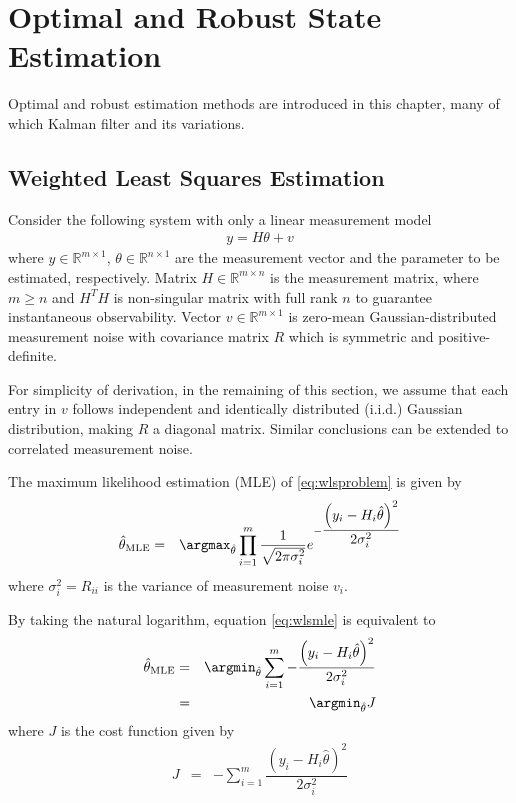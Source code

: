 \chapter{Optimal and Robust State Estimation} \label{ch:orse}

Optimal and robust estimation methods are introduced in this chapter, many of which Kalman filter and its variations.

\section{Weighted Least Squares Estimation}


Consider the following system with only a linear measurement model
\begin{eqnarray}
	y = H\theta + v \label{eq:wlsproblem}
\end{eqnarray}
where $y\in\mathbb{R}^{m\times 1}$, $\theta\in\mathbb{R}^{n\times 1}$ are the measurement vector and the parameter to be estimated, respectively. Matrix $H\in\mathbb{R}^{m\times n}$ is the measurement matrix, where $m\geq n$ and $H^TH$ is non-singular matrix with full rank $n$ to guarantee instantaneous observability. Vector $v\in\mathbb{R}^{m\times 1}$ is zero-mean Gaussian-distributed measurement noise with covariance matrix $R$ which is symmetric and positive-definite. 

For simplicity of derivation, in the remaining of this section, we assume that each entry in $v$ follows independent and identically distributed (i.i.d.) Gaussian distribution, making $R$ a diagonal matrix. Similar conclusions can be extended to correlated measurement noise.

The maximum likelihood estimation (MLE) of \eqref{eq:wlsproblem} is given by
\begin{eqnarray}
	\hat{\theta}_{\textup{MLE}} &=& \argmax_{\hat{\theta}} \prod_{i=1}^{m} \dfrac{1}{\sqrt{2\pi\sigma_i^2}} e^{-\dfrac{\left(y_i-H_i\hat{\theta}\right)^2}{2\sigma_i^2}} \label{eq:wlsmle}
\end{eqnarray}
where $\sigma_i^2 = R_{ii}$ is the variance of measurement noise $v_i$.

By taking the natural logarithm, equation \eqref{eq:wlsmle} is equivalent to
\begin{eqnarray}
	\hat{\theta}_{\textup{MLE}} &=& \argmin_{\hat{\theta}} \sum_{i=1}^{m} - \dfrac{\left(y_i-H_i\hat{\theta}\right)^2}{2\sigma_i^2} \nonumber \\
	&=& \argmin_{\hat{\theta}} J \nonumber
\end{eqnarray}
where $J$ is the cost function given by
\begin{eqnarray}
	J &=& - \sum_{i=1}^{m} \dfrac{\left(y_i-H_i\hat{\theta}\right)^2}{2\sigma_i^2} \label{eq:wlsmle2}
\end{eqnarray}

